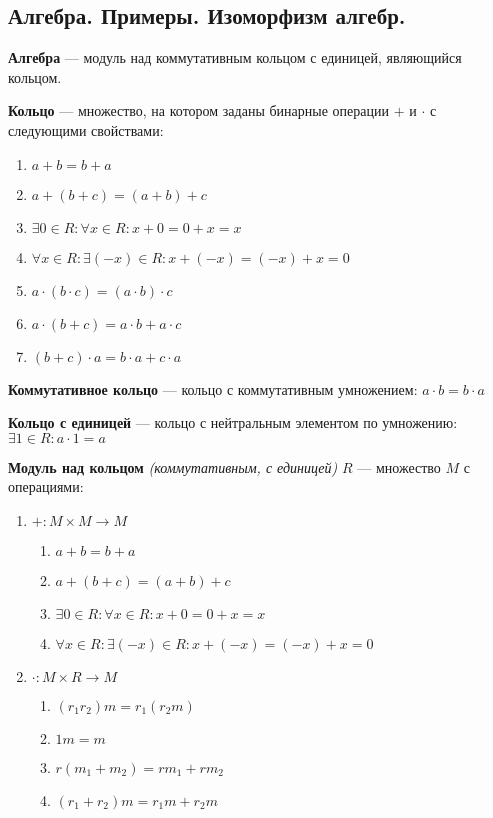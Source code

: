 

\cfoot{}

\newcommand{\secс}[1]{\subsection*{\centering #1}}



\secс{1.3 Алгебра. Примеры. Изоморфизм алгебр.}

\textbf{Алгебра} --- модуль над коммутативным кольцом с единицей, являющийся кольцом.

\textbf{Кольцо} --- множество, на котором заданы бинарные операции $+$ и $\cdot$ с следующими свойствами:
\begin{enumerate}
    \item $a+b=b+a$
    \item $a+(b+c)=(a+b)+c$
    \item $\exists 0\in R : \forall x\in R : x + 0 = 0 + x = x$
    \item $\forall x\in R : \exists (-x)\in R : x + (-x) = (-x) + x = 0$
    \item $a\cdot(b\cdot c)=(a\cdot b)\cdot c$
    \item $a\cdot (b + c) = a \cdot b + a \cdot c$
    \item $(b + c)\cdot a = b \cdot a + c \cdot a$
\end{enumerate}

\textbf{Коммутативное кольцо} --- кольцо с коммутативным умножением: $a\cdot b = b\cdot a$

\textbf{Кольцо с единицей} --- кольцо с нейтральным элементом по умножению: $\exists 1\in R : a\cdot 1 = a$

\textbf{Модуль над кольцом} \textit{(коммутативным, с единицей)} $R$ --- множество $M$ с операциями:
\begin{enumerate}
    \item $+:M\times M\to M$ \begin{enumerate}
        \item $a+b=b+a$
        \item $a+(b+c)=(a+b)+c$
        \item $\exists 0\in R : \forall x\in R : x + 0 = 0 + x = x$
        \item $\forall x\in R : \exists (-x)\in R : x + (-x) = (-x) + x = 0$
    \end{enumerate}
    \item $\cdot : M\times R\to M$ \begin{enumerate}
        \item $(r_1r_2)m=r_1(r_2m)$
        \item $1m=m$
        \item $r(m_1+m_2)=rm_1+rm_2$
        \item $(r_1+r_2)m=r_1m+r_2m$
    \end{enumerate}
\end{enumerate}

